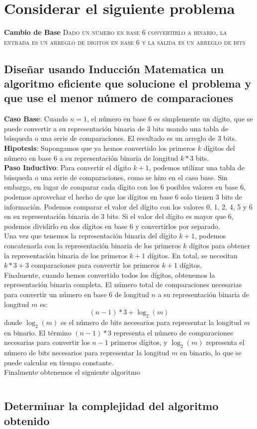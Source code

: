 \section{Considerar el siguiente problema}

\textbf{Cambio de Base}
\textsc{Dado un número en base 6 convertirlo a binario, la entrada es un arreglo de digitos en base 6 y la salida es un arreglo de bits}

\subsection{Diseñar usando Inducción Matematica un algoritmo eficiente que solucione el problema y que use el 
menor número de comparaciones}
\textbf{Caso Base}: Cuando $n=1$, el número en base 6 es simplemente un dígito, que se puede convertir a su 
representación binaria de 3 bits usando una tabla de búsqueda o una serie de comparaciones. El resultado es un arreglo de 3 bits.\\
\textbf{Hipotesis}: Supongamos que ya hemos convertido los primeros $k$ dígitos del número en base 6 a su 
representación binaria de longitud $k*3$ bits. \\
\textbf{Paso Inductivo}: Para convertir el dígito $k+1$, podemos utilizar una tabla de búsqueda o una serie 
de comparaciones, como se hizo en el caso base. Sin embargo, en lugar de comparar cada dígito con los 6 posibles valores en base 6, 
podemos aprovechar el hecho de que los dígitos en base 6 solo tienen 3 bits de información. Podemos comparar el 
valor del dígito con los valores 0, 1, 2, 4, 5 y 6 en su representación binaria de 3 bits. Si el valor del dígito 
es mayor que 6, podemos dividirlo en dos dígitos en base 6 y convertirlos por separado.\\
Una vez que tenemos la representación binaria del dígito $k+1$, podemos concatenarla con la representación 
binaria de los primeros $k$ dígitos para obtener la representación binaria de los primeros $k+1$ dígitos. 
En total, se necesitan $k*3+3$ comparaciones para convertir los primeros $k+1$ dígitos.\\
Finalmente, cuando hemos convertido todos los dígitos, obtenemos la representación binaria completa. El número total de comparaciones necesarias para convertir un número en base 6 de longitud $n$ a su representación binaria de longitud $m$ es:
    \[(n-1)*3 + \log_2(m)\]
donde $\log_2(m)$ es el número de bits necesarios para representar la longitud $m$ en binario. El término $(n-1)*3$ representa el número de comparaciones necesarias para convertir los $n-1$ primeros dígitos, y $\log_2(m)$ representa el número de bits necesarios para representar la longitud $m$ en binario, lo que se puede calcular en tiempo constante.\\

Finalmente obtenemos el siguiente algoritmo

\begin{lstlisting}[language=python]

\end{lstlisting}

\subsection{Determinar la complejidad del algoritmo obtenido}
